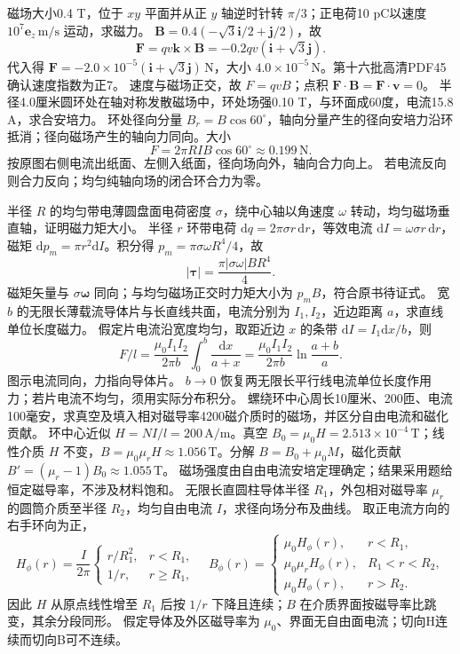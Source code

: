 \problemtext 磁场大小0.4 T，位于 $xy$ 平面并从正 $y$ 轴逆时针转 $\pi/3$；正电荷10 pC以速度 $10^7\bm e_z\,\mathrm{m/s}$ 运动，求磁力。
\workings $\bm B=0.4(-\sqrt3\bm i/2+\bm j/2)$，故
\[
\bm F=qv\bm k\times\bm B=-0.2qv(\bm i+\sqrt3\bm j).
\]
代入得 $\bm F=-2.0\times10^{-5}(\bm i+\sqrt3\bm j)\,\mathrm N$，大小 $4.0\times10^{-5}\,\mathrm N$。第十六批高清PDF45确认速度指数为正7。
\crosscheck 速度与磁场正交，故 $F=qvB$；点积 $\bm F\cdot\bm B=\bm F\cdot\bm v=0$。
\problemtext 半径4.0厘米圆环处在轴对称发散磁场中，环处场强0.10 T，与环面成60度，电流15.8 A，求合安培力。
\workings 环处径向分量 $B_r=B\cos60^\circ$，轴向分量产生的径向安培力沿环抵消；径向磁场产生的轴向力同向。大小
\[
F=2\pi RIB\cos60^\circ\approx0.199\,\mathrm N.
\]
按原图右侧电流出纸面、左侧入纸面，径向场向外，轴向合力向上。
\crosscheck 若电流反向则合力反向；均匀纯轴向场的闭合环合力为零。

\problemtext 半径 $R$ 的均匀带电薄圆盘面电荷密度 $\sigma$，绕中心轴以角速度 $\omega$ 转动，均匀磁场垂直轴，证明磁力矩大小。
\workings 半径 $r$ 环带电荷 $\mathrm dq=2\pi\sigma r\,\mathrm dr$，等效电流 $\mathrm dI=\omega\sigma r\,\mathrm dr$，磁矩 $\mathrm dp_m=\pi r^2\mathrm dI$。积分得 $p_m=\pi\sigma\omega R^4/4$，故
\[
|\bm\tau|=\frac{\pi|\sigma\omega|BR^4}{4}.
\]
\crosscheck 磁矩矢量与 $\sigma\bm\omega$ 同向；与均匀磁场正交时力矩大小为 $p_mB$，符合原书待证式。
\problemtext 宽 $b$ 的无限长薄载流导体片与长直线共面，电流分别为 $I_1,I_2$，近边距离 $a$，求直线单位长度磁力。
\workings 假定片电流沿宽度均匀，取距近边 $x$ 的条带 $\mathrm dI=I_1\mathrm dx/b$，则
\[
F/l=\frac{\mu_0 I_1 I_2}{2\pi b}\int_0^b\frac{\mathrm dx}{a+x}
=\frac{\mu_0 I_1 I_2}{2\pi b}\ln\frac{a+b}{a}.
\]
图示电流同向，力指向导体片。
\crosscheck $b\to0$ 恢复两无限长平行线电流单位长度作用力；若片电流不均匀，须用实际分布积分。
\problemtext 螺绕环中心周长10厘米、200匝、电流100毫安，求真空及填入相对磁导率4200磁介质时的磁场，并区分自由电流和磁化贡献。
\workings 环中心近似 $H=NI/l=200\,\mathrm{A/m}$。真空 $B_0=\mu_0H=2.513\times10^{-4}\,\mathrm T$；线性介质 $H$ 不变，$B=\mu_0\mu_rH\approx1.056\,\mathrm T$。分解 $B=B_0+\mu_0M$，磁化贡献 $B'= (\mu_r-1)B_0\approx1.055\,\mathrm T$。
\crosscheck 磁场强度由自由电流安培定理确定；结果采用题给恒定磁导率，不涉及材料饱和。
\problemtext 无限长直圆柱导体半径 $R_1$，外包相对磁导率 $\mu_r$ 的圆筒介质至半径 $R_2$，均匀自由电流 $I$，求径向场分布及曲线。
\workings 取正电流方向的右手环向为正，
\[
H_\phi(r)=\frac I{2\pi}\begin{cases}r/R_1^2,&r<R_1,\\1/r,&r\ge R_1,\end{cases}
\quad B_\phi(r)=\begin{cases}
\mu_0 H_\phi(r),&r<R_1,\\
\mu_0\mu_r H_\phi(r),&R_1<r<R_2,\\
\mu_0H_\phi(r),&r>R_2.
\end{cases}
\]
因此 $H$ 从原点线性增至 $R_1$ 后按 $1/r$ 下降且连续；$B$ 在介质界面按磁导率比跳变，其余分段同形。
\crosscheck 假定导体及外区磁导率为 $\mu_0$、界面无自由面电流；切向H连续而切向B可不连续。
